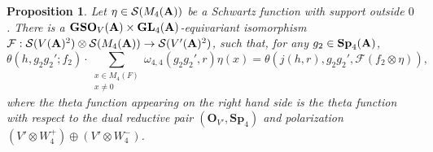\documentclass[11pt, reqno]{amsart}
\theoremstyle{plain}
\newtheorem{proposition}[theorem]{Proposition}
\theoremstyle{definition}
\theoremstyle{remark}
\theoremstyle{plain}
\def\A{{\bf A}}
\def\Sp{{\mathbf{Sp}}}
\def\GL{\mathbf{GL}}
\begin{document}
\begin{proposition}\label{Product:Theta:Functions}
    Let $\eta \in \mathcal{S}(M_4(\A))$ be a Schwartz function with support outside $0$. There is a $\mathbf{GSO}_V(\A)\times \GL_4(\A)$-equivariant isomorphism $\mathcal{F}:\mathcal{S}(V(\A)^2)\otimes \mathcal{S}(M_4(\A))\to \mathcal{S}(V'(\A)^2)$, such that, for any $g_2 \in \Sp_4(\A)$,   
    \[\theta(h,g_2g_2';f_2)\cdot \!\!\sum_{\substack{x\in M_4(F)\\x\neq 0}}\omega_{4,4}(g_2g_2',r)\eta(x) = \theta(j(h,r), g_2g_2', \mathcal{F}(f_2\otimes \eta)), \]
    where the theta function appearing on the right hand side is the theta function with respect to the dual reductive pair $(\mathbf{O}_{V'},\Sp_4)$ and polarization $\left(V'\otimes W_4^+\right)\oplus\left(V' \otimes W_4^-\right)$. 
\end{proposition}
\end{document}
